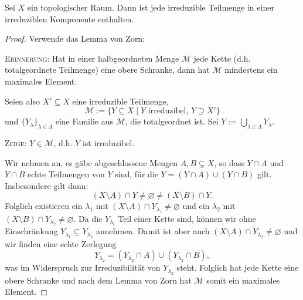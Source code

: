 \documentclass[a4paper,12pt,index=toc]{scrbook}
\theoremstyle{keinenummern} %
\def\M{\mathcal{M}}
\newcommand{\leer}{\ensuremath{\varnothing}}
\begin{document}
\begin{prop}\label{1.2.10} Sei $X$ ein topologischer Raum. Dann ist jede irreduzible Teilmenge in einer irreduziblen Komponente enthalten.\end{prop}
\begin{proof} Verwende das Lemma von Zorn:

{\scshape Erinnerung:} Hat in einer halbgeordneten Menge $\M$ jede Kette (d.h. totalgeordnete Teilmenge) eine obere Schranke, dann hat $\M$ mindestens ein maximales Element.

Seien also $X'\subseteq X$ eine irreduzible Teilmenge, 
\[\M:=\{Y\subseteq X\mid Y\text{ irreduzibel, }Y\supseteq X'\}\]
und $\{Y_{\lambda}\}_{\lambda\in\Lambda}$ eine Familie aus $\M$, die totalgeordnet ist. Sei $\displaystyle Y:=\bigcup_{\lambda\in\Lambda}Y_{\lambda}$.

{\scshape Zeige:} $Y\in\M$, d.h. $Y$ ist irreduzibel.

Wir nehmen an, es gäbe abgeschlossene Mengen $A,B\subsetneq X$, so dass $Y\cap A$ und $Y\cap B$ echte Teilmengen von $Y$ sind, für die $Y=(Y\cap A)\cup(Y\cap B)$ gilt. Insbesondere gilt dann:
\[(X\setminus A)\cap Y\neq\leer\neq (X\setminus B)\cap Y.\]
Folglich existieren ein $\lambda_{1}$ mit $(X\setminus A)\cap Y_{\lambda_{1}}\neq\leer$ und ein $\lambda_{2}$ mit $(X\setminus B)\cap Y_{\lambda_{2}}\neq\leer$. Da die $Y_{\lambda_{i}}$ Teil einer Kette sind, können wir ohne Einschränkung $Y_{\lambda_{1}}\subseteq Y_{\lambda_{2}}$ annehmen. Damit ist aber auch $(X\setminus A)\cap Y_{\lambda_{2}}\neq\leer$ und wir finden eine echte Zerlegung
\[Y_{\lambda_{2}}=(Y_{\lambda_{2}}\cap A)\cup(Y_{\lambda_{2}}\cap B),\]
was im Widerspruch zur Irreduzibilität von $Y_{\lambda_{2}}$ steht. Folglich hat jede Kette eine obere Schranke und nach dem Lemma von Zorn hat $\M$ somit ein maximales Element.
\end{proof}
\end{document}
